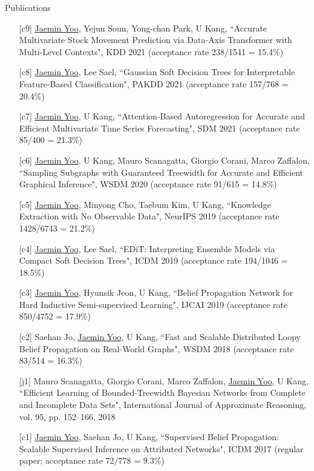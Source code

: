 \documentclass{resume} %
\begin{document}
\begin{rSection}{Publications}
\smallskip
\begin{enumerate}

	\item[{[c9]}] \underline{Jaemin Yoo}, Yejun Soun, Yong-chan Park, U Kang, ``Accurate Multivariate Stock Movement Prediction via Data-Axis Transformer with Multi-Level Contexts", KDD 2021 (acceptance rate 238/1541 = 15.4\%)

	\item[{[c8]}] \underline{Jaemin Yoo}, Lee Sael, ``Gaussian Soft Decision Trees for Interpretable Feature-Based Classification", PAKDD 2021 (acceptance rate 157/768 = 20.4\%)
		
	\item[{[c7]}] \underline{Jaemin Yoo}, U Kang, ``Attention-Based Autoregression for Accurate and Efficient Multivariate Time Series Forecasting", SDM 2021 (acceptance rate 85/400 = 21.3\%)

	\item[{[c6]}] \underline{Jaemin Yoo}, U Kang, Mauro Scanagatta, Giorgio Corani, Marco Zaffalon, ``Sampling Subgraphs with Guaranteed Treewidth for Accurate and Efficient Graphical Inference", WSDM 2020 (acceptance rate 91/615 = 14.8\%)

	\item[{[c5]}] \underline{Jaemin Yoo}, Minyong Cho, Taebum Kim, U Kang, ``Knowledge Extraction with No Observable Data", NeurIPS 2019 (acceptance rate 1428/6743 = 21.2\%)

	\item[{[c4]}] \underline{Jaemin Yoo}, Lee Sael, ``EDiT: Interpreting Ensemble Models via Compact Soft Decision Trees", ICDM 2019 (acceptance rate 194/1046 = 18.5\%)

	\item[{[c3]}] \underline{Jaemin Yoo}, Hyunsik Jeon, U Kang, ``Belief Propagation Network for Hard Inductive Semi-supervised Learning", IJCAI 2019 (acceptance rate 850/4752 = 17.9\%)

	\item[{[c2]}] Saehan Jo, \underline{Jaemin Yoo}, U Kang, ``Fast and Scalable Distributed Loopy Belief Propagation on Real-World Graphs", WSDM 2018 (acceptance rate 83/514 = 16.3\%)

	\item[{[j1]}] Mauro Scanagatta, Giorgio Corani, Marco Zaffalon, \underline{Jaemin Yoo}, U Kang, ``Efficient Learning of Bounded-Treewidth Bayesian Networks from Complete and Incomplete Data Sets", International Journal of Approximate Reasoning, vol. 95, pp. 152--166, 2018

	\item[{[c1]}] \underline{Jaemin Yoo}, Saehan Jo, U Kang, ``Supervised Belief Propagation: Scalable Supervised Inference on Attributed Networks", ICDM 2017 (regular paper; acceptance rate 72/778 = 9.3\%)

\end{enumerate}
\end{rSection}
\end{document}
